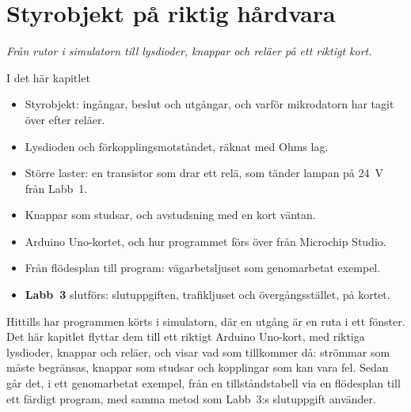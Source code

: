 
\chapter{Styrobjekt på riktig hårdvara}
\label{c11:ch}

{\large\itshape Från rutor i simulatorn till lysdioder, knappar och reläer på ett riktigt
kort.\par}

\begin{chapterbox}{I det här kapitlet}
\begin{itemize}
  \item Styrobjekt: ingångar, beslut och utgångar, och varför mikrodatorn har tagit över efter
    reläer.
  \item Lysdioden och förkopplingsmotståndet, räknat med Ohms lag.
  \item Större laster: en transistor som drar ett relä, som tänder lampan på 24~V från Labb~1.
  \item Knappar som studsar, och avstudsning med en kort väntan.
  \item Arduino Uno-kortet, och hur programmet förs över från Microchip Studio.
  \item Från flödesplan till program: vägarbetsljuset som genomarbetat exempel.
  \item \textbf{Labb~3} slutförs: slutuppgiften, trafikljuset och övergångsstället, på kortet.
\end{itemize}
\end{chapterbox}

Hittills har programmen körts i simulatorn, där en utgång är en ruta i ett fönster. Det här
kapitlet flyttar dem till ett riktigt Arduino Uno-kort, med riktiga lysdioder, knappar och reläer,
och visar vad som tillkommer då: strömmar som måste begränsas, knappar som studsar och kopplingar
som kan vara fel. Sedan går det, i ett genomarbetat exempel, från en tillståndstabell via en
flödesplan till ett färdigt program, med samma metod som Labb~3:s slutuppgift använder.

